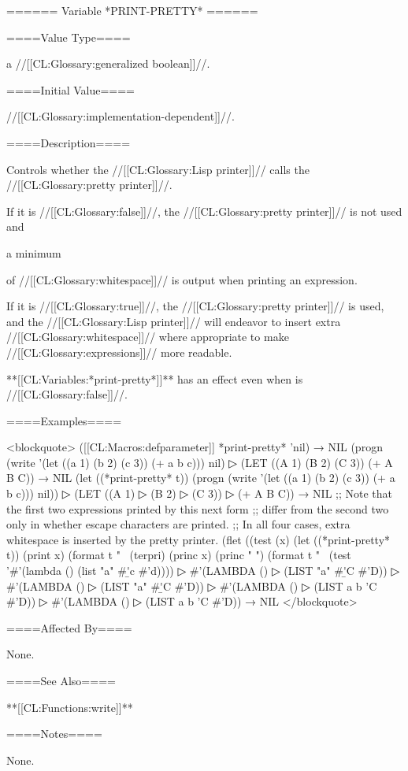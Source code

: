 ====== Variable *PRINT-PRETTY* ======

====Value Type====

a //[[CL:Glossary:generalized boolean]]//.

====Initial Value====

//[[CL:Glossary:implementation-dependent]]//.

====Description====

Controls whether the //[[CL:Glossary:Lisp printer]]// calls the //[[CL:Glossary:pretty printer]]//.

If it is //[[CL:Glossary:false]]//, the //[[CL:Glossary:pretty printer]]// is not used and

a minimum

of //[[CL:Glossary:whitespace]]// is output when printing an expression.

If it is //[[CL:Glossary:true]]//, the //[[CL:Glossary:pretty printer]]// is used, and the //[[CL:Glossary:Lisp printer]]// will endeavor to insert extra //[[CL:Glossary:whitespace]]// where appropriate to make //[[CL:Glossary:expressions]]// more readable.

**[[CL:Variables:*print-pretty*]]** has an effect even when  is //[[CL:Glossary:false]]//.

====Examples====

<blockquote> ([[CL:Macros:defparameter]] *print-pretty* 'nil) → NIL (progn (write '(let ((a 1) (b 2) (c 3)) (+ a b c))) nil)
▷ (LET ((A 1) (B 2) (C 3)) (+ A B C)) → NIL (let ((*print-pretty* t)) (progn (write '(let ((a 1) (b 2) (c 3)) (+ a b c))) nil))
▷ (LET ((A 1)
▷ (B 2)
▷ (C 3))
▷ (+ A B C)) → NIL ;; Note that the first two expressions printed by this next form ;; differ from the second two only in whether escape characters are printed. ;; In all four cases, extra whitespace is inserted by the pretty printer. (flet ((test (x) (let ((*print-pretty* t)) (print x) (format t "~ (terpri) (princ x) (princ " ") (format t "~ (test '#'(lambda () (list "a" #\b 'c #'d))))
▷ #'(LAMBDA ()
▷ (LIST "a" #\b 'C #'D))
▷ #'(LAMBDA ()
▷ (LIST "a" #\b 'C #'D))
▷ #'(LAMBDA ()
▷ (LIST a b 'C #'D))
▷ #'(LAMBDA ()
▷ (LIST a b 'C #'D)) → NIL </blockquote>

====Affected By====

None.

====See Also====

**[[CL:Functions:write]]**

====Notes====

None.

 
